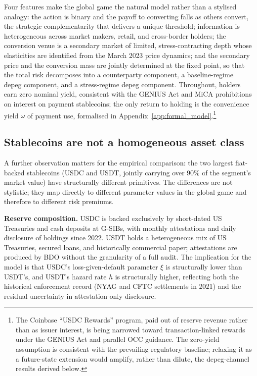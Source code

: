 Four features make the global game the natural model rather than a stylised analogy: the action is binary and the payoff to converting falls as others convert, the strategic complementarity that delivers a unique threshold; information is heterogeneous across market makers, retail, and cross-border holders; the conversion venue is a secondary market of limited, stress-contracting depth whose elasticities are identified from the March 2023 price dynamics; and the secondary price and the conversion mass are jointly determined at the fixed point, so that the total risk decomposes into a counterparty component, a baseline-regime depeg component, and a stress-regime depeg component. Throughout, holders earn zero nominal yield, consistent with the GENIUS Act and MiCA prohibitions on interest on payment stablecoins; the only return to holding is the convenience yield $\omega$ of payment use, formalised in Appendix~\ref{app:formal_model}.\footnote{The Coinbase ``USDC Rewards'' program, paid out of reserve revenue rather than as issuer interest, is being narrowed toward transaction-linked rewards under the GENIUS Act and parallel OCC guidance. The zero-yield assumption is consistent with the prevailing regulatory baseline; relaxing it as a future-state extension would amplify, rather than dilute, the depeg-channel results derived below.}

\subsection{Stablecoins are not a homogeneous asset class}\label{sub:not_homogeneous}

A further observation matters for the empirical comparison: the two largest fiat-backed stablecoins (USDC and USDT, jointly carrying over 90\% of the segment's market value) have structurally different primitives. The differences are not stylistic; they map directly to different parameter values in the global game and therefore to different risk premiums.

\textbf{Reserve composition.} USDC is backed exclusively by short-dated US Treasuries and cash deposits at G-SIBs, with monthly attestations and daily disclosure of holdings since 2022. USDT holds a heterogeneous mix of US Treasuries, secured loans, and historically commercial paper; attestations are produced by BDO without the granularity of a full audit. The implication for the model is that USDC's loss-given-default parameter $\xi$ is structurally lower than USDT's, and USDT's hazard rate $h$ is structurally higher, reflecting both the historical enforcement record (NYAG and CFTC settlements in 2021) and the residual uncertainty in attestation-only disclosure.

